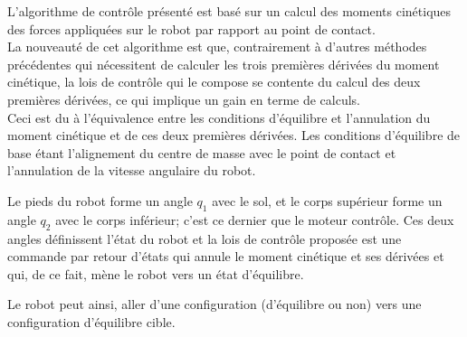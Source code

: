 \documentclass[a4paper,12pt]{report}
\begin{document}
L'algorithme de contrôle présenté est basé sur un calcul des moments cinétiques des forces appliquées sur le robot par rapport au point de contact.\\
La nouveauté de cet algorithme est que, contrairement à d'autres méthodes précédentes qui nécessitent de calculer les trois premières dérivées du moment cinétique, la lois de contrôle qui le compose se contente du calcul des deux premières dérivées, ce qui implique un gain en terme de calculs.\\
Ceci est du à l'équivalence entre les conditions d'équilibre et l'annulation du moment cinétique et de ces deux premières dérivées. Les conditions d'équilibre de base étant l'alignement du centre de masse avec le point de contact et l'annulation de la vitesse angulaire du robot.

Le pieds du robot forme un angle $q_1$ avec le sol, et le corps supérieur forme un angle $q_2$ avec le corps inférieur; c'est ce dernier que le moteur contrôle. Ces deux angles définissent l'état du robot et la lois de contrôle proposée est une commande par retour d'états qui annule le moment cinétique et ses dérivées et qui, de ce fait, mène le robot vers un état d'équilibre.

Le robot peut ainsi, aller d'une configuration (d'équilibre ou non) vers une configuration d'équilibre cible.



\end{document}
